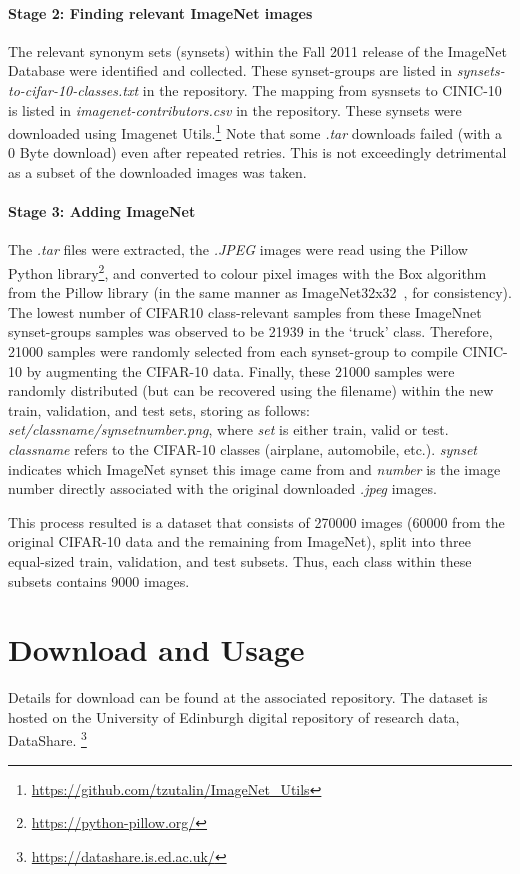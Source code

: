 \documentclass[coverpage]{Style/inftechrep}
\begin{document}
\paragraph{Stage 2: Finding relevant ImageNet images} 
The relevant synonym sets (synsets) within the Fall 2011 release of the ImageNet Database were identified and collected. These synset-groups are listed in \textit{synsets-to-cifar-10-classes.txt} in the repository. The mapping from sysnsets to CINIC-10 is listed in \textit{imagenet-contributors.csv} in the repository. These synsets were downloaded using Imagenet Utils.\footnote{\url{https://github.com/tzutalin/ImageNet_Utils}} Note that some \textit{.tar} downloads failed (with a 0 Byte download) even after repeated retries. This is not exceedingly detrimental as a subset of the downloaded images was taken.

\paragraph{Stage 3: Adding ImageNet} 
The \textit{.tar} files were extracted, the \textit{.JPEG} images were read using the Pillow Python library\footnote{\url{https://python-pillow.org/}}, and converted to  colour pixel images with the Box algorithm from the Pillow library (in the same manner as ImageNet32x32~\citep{imagenet32}, for consistency). The lowest number of CIFAR10 class-relevant samples from these ImageNnet synset-groups samples was observed to be 21939 in the `truck' class. Therefore, 21000 samples were randomly selected from each synset-group to compile CINIC-10 by augmenting the CIFAR-10 data. Finally, these 21000 samples were randomly distributed (but can be recovered using the filename) within the new train, validation, and test sets, storing as follows: {\it set/classname/synsetnumber.png}, where {\it set} is either train, valid or test. {\it classname} refers to the CIFAR-10 classes (airplane, automobile, etc.). {\it synset} indicates which ImageNet synset this image came from and {\it number} is the image number directly associated with the original downloaded \textit{.jpeg} images.

This process resulted is a dataset that consists of 270000 images (60000 from the original CIFAR-10 data and the remaining from ImageNet), split into three equal-sized train, validation, and test subsets. Thus, each class within these subsets contains 9000 images.

\section{Download and Usage}
Details for download can be found at the associated repository. The dataset is hosted on the University of Edinburgh digital repository of research data, DataShare. \footnote{\url{https://datashare.is.ed.ac.uk/}}
\end{document}
